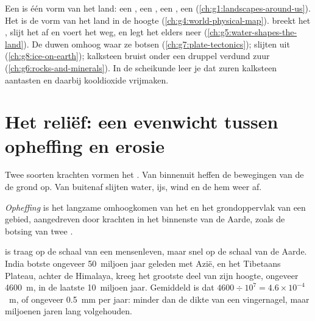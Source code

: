 \begin{recall}
Een \emph{} is één vorm van het land: een , een , een
, een  (\cref{ch:g1:landscapes-around-us}). Het  is de vorm
van het land in de hoogte (\cref{ch:g4:world-physical-map}). 
breekt het ,  slijt het af en voert het weg, en 
legt het elders neer (\cref{ch:g5:water-shapes-the-land}). De  duwen
 omhoog waar ze botsen (\cref{ch:g7:plate-tectonics}); 
slijten  uit (\cref{ch:g8:ice-on-earth}); kalksteen bruist onder een
druppel verdund zuur (\cref{ch:g6:rocks-and-minerals}). In de scheikunde
leer je dat zuren kalksteen aantasten en daarbij kooldioxide vrijmaken.
\end{recall}

\section{Het reliëf: een evenwicht tussen opheffing en erosie}

Twee soorten krachten vormen het . Van binnenuit heffen de
bewegingen van de  de grond op. Van buitenaf slijten water, ijs, wind
en de  hem weer af.

\begin{definition}[Opheffing]\label{def:g9:landforms:uplift}
\emph{Opheffing} is het langzame omhoogkomen van het
 en het grondoppervlak van een gebied, aangedreven door krachten
in het binnenste van de Aarde, zoals de botsing van twee .
\end{definition}

 is traag op de schaal van een mensenleven, maar snel op de schaal
van de Aarde. India botste ongeveer 50~miljoen jaar geleden met Azië, en
het Tibetaans Plateau, achter de Himalaya, kreeg het grootste deel van zijn
hoogte, ongeveer \qty{4600}{m}, in de laatste 10~miljoen jaar. Gemiddeld is
dat $4600 \div 10^7 = 4.6 \times 10^{-4}$~m, of ongeveer \qty{0.5}{mm} per
jaar: minder dan de dikte van een vingernagel, maar miljoenen jaren lang
volgehouden.

